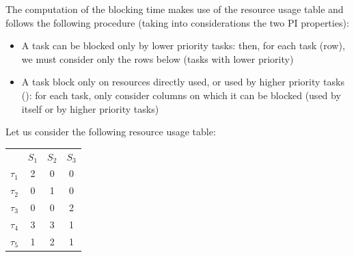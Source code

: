 The computation of the blocking time makes use of the resource usage table and follows the following procedure (taking into considerations the two PI properties):
\begin{itemize}
    \item A task can be blocked only by lower priority tasks: then, for each task (row), we must consider only the rows below (tasks with lower priority)
    \item A task block only on resources directly used, or used by higher priority tasks (): for each task, only consider columns on which it can be blocked (used by itself or by higher priority tasks)
\end{itemize}

Let us consider the following resource usage table:
\begin{table}[!h]
    \centering 
    \begin{NiceTabular}[hvlines]{cccc}
        & $S_1$& $S_2$& $S_3$\\
        $\tau_1$&2&0&0\\
        $\tau_2$&0&1&0\\
        $\tau_3$&0&0&2\\
        $\tau_4$&3&3&1\\
        $\tau_5$&1&2&1
    \end{NiceTabular}
\end{table}

